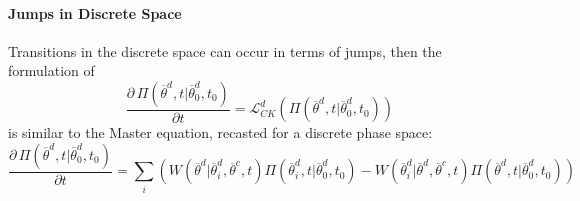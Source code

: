 %
%
%
%
\paragraph{Jumps in Discrete Space}
\label{subsec:CKJumpsDiscrete}
Transitions in the discrete space can occur in terms of jumps, then the formulation of 
\begin{equation}
\frac{\partial \, \Pi \left (\overline{\theta}^{d},t|\overline{\theta}^{d}_{0},t_{0}  \right ) }{\partial t} =  
\mathcal{L}_{CK}^{d}\left ( \Pi \left (\overline{\theta}^{d},t|\overline{\theta}_{0}^{d},t_{0}  
\right )  \right )
\end{equation}
is similar to the Master equation, recasted for a discrete phase space:
\begin{equation}
\frac{\partial \, \Pi \left (\overline{\theta}^{d},t|\overline{\theta}^{d}_{0},t_{0}  \right ) }{\partial t} =  \sum_{i} \left (  W\left ( \overline{\theta}^{d}|
\overline{\theta}^{d}_{i},\overline{\theta}^{c},t \right )\Pi \left (\overline{\theta}^{d}_{i},t|\overline{\theta}^{d}_{0},t_{0}  
\right ) - W\left ( \overline{\theta}^{d}_{i}|
\overline{\theta}^{d},\overline{\theta}^{c},t \right )\Pi \left (\overline{\theta}^{d},t|\overline{\theta}_{0}^{d},t_{0}  
\right )  \right ) 
\end{equation}

%
%
%
%
%
%
%
%
%
%
%
%
